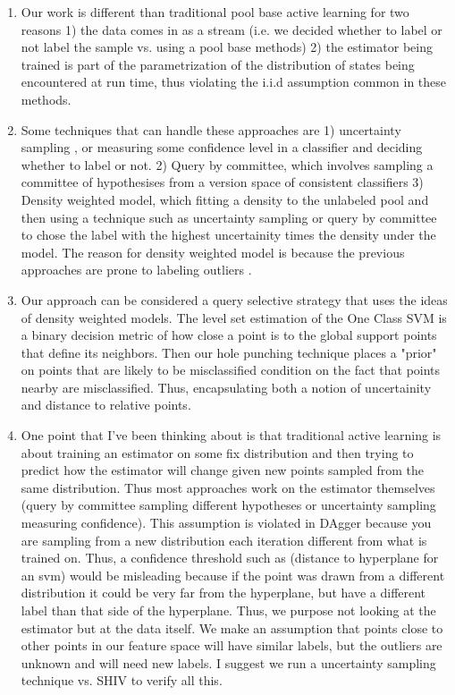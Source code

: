\documentclass[10pt, conference]{ieeeconf}      %
\begin{document}
\begin{enumerate}
\item Our work is different than traditional pool base active learning for two reasons 1) the data comes in as a stream (i.e. we decided whether to label or not label the sample vs. using a pool base methods) 2) the estimator being trained is part of the parametrization of the distribution of states being encountered at run time, thus violating the i.i.d assumption common in these methods. 
\item Some techniques that can handle these approaches are 1) uncertainty sampling , or measuring some confidence level in a classifier and deciding whether to label or not. 2) Query by committee, which involves sampling a committee of hypothesises from a version space of consistent classifiers 3) Density weighted model, which fitting a density to the unlabeled pool and then using a technique such as uncertainty sampling or query by committee to chose the label with the highest uncertainity times the density under the model. The reason for density weighted model is because the previous approaches are prone to labeling outliers \cite{settles2008analysis}. 
\item Our approach can be considered a query selective strategy that uses the ideas of density weighted models. The level set estimation of the One Class SVM is a binary decision metric of how close a point is to the global support points that define its neighbors. Then our hole punching technique places a "prior" on points that are likely to be misclassified condition on the fact that points nearby are misclassified. Thus, encapsulating both a notion of uncertainity and distance to relative points. 
\item One point that I've been thinking about is that traditional active learning is about training an estimator on some fix distribution and then trying to predict how the estimator will change given new points sampled from the same distribution. Thus most approaches work on the estimator themselves (query by committee sampling different hypotheses or uncertainty sampling measuring confidence). This assumption is violated in DAgger because you are sampling from a new distribution each iteration different from what is trained on. Thus, a confidence threshold such as (distance to hyperplane for an svm) would be misleading because if the point was drawn from a different distribution it could be very far from the hyperplane, but have a different label than that side of the hyperplane. Thus, we purpose not looking at the estimator but at the data itself. We make an assumption that points close to other points in our feature space will have similar labels, but the outliers are unknown and will need new labels. I suggest we run a uncertainty sampling technique vs. SHIV to verify all this. 

\end{enumerate}
\end{document}
